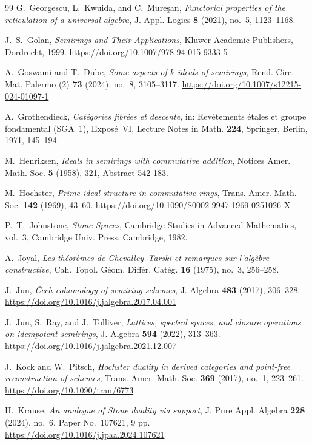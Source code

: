 \documentclass[12pt,leqno]{amsart}
\theoremstyle{definition}
\numberwithin{equation}{section}
\theoremstyle{remark}
\begin{document}
\begin{thebibliography}{99}
G.~Georgescu, L.~Kwuida, and C.~Mure\c{s}an,
\emph{Functorial properties of the reticulation of a universal algebra},
J. Appl. Logics \textbf{8} (2021), no.~5, 1123--1168.

J.~S.~Golan,
\emph{Semirings and Their Applications},
Kluwer Academic Publishers, Dordrecht, 1999.
\url{https://doi.org/10.1007/978-94-015-9333-5}

A.~Goswami and T.~Dube,
\emph{Some aspects of $k$-ideals of semirings},
Rend. Circ. Mat. Palermo (2) \textbf{73} (2024), no.~8, 3105--3117.
\url{https://doi.org/10.1007/s12215-024-01097-1}

A.~Grothendieck,
\emph{Cat\'egories fibr\'ees et descente},
in: Rev\^etements \'etales et groupe fondamental (SGA~1), Expos\'e~VI,
Lecture Notes in Math. \textbf{224}, Springer, Berlin, 1971, 145--194.

M.~Henriksen,
\emph{Ideals in semirings with commutative addition},
Notices Amer. Math. Soc. \textbf{5} (1958), 321, Abstract 542-183.

M.~Hochster,
\emph{Prime ideal structure in commutative rings},
Trans. Amer. Math. Soc. \textbf{142} (1969), 43--60.
\url{https://doi.org/10.1090/S0002-9947-1969-0251026-X}

P.~T.~Johnstone,
\emph{Stone Spaces},
Cambridge Studies in Advanced Mathematics, vol.~3,
Cambridge Univ. Press, Cambridge, 1982.

A.~Joyal,
\emph{Les th\'eor\`emes de Chevalley--Tarski et remarques sur l'alg\`ebre constructive},
Cah. Topol. G\'eom. Diff\'er. Cat\'eg. \textbf{16} (1975), no.~3, 256--258.

J.~Jun,
\emph{\v{C}ech cohomology of semiring schemes},
J. Algebra \textbf{483} (2017), 306--328.
\url{https://doi.org/10.1016/j.jalgebra.2017.04.001}

J.~Jun, S.~Ray, and J.~Tolliver,
\emph{Lattices, spectral spaces, and closure operations on idempotent semirings},
J. Algebra \textbf{594} (2022), 313--363.
\url{https://doi.org/10.1016/j.jalgebra.2021.12.007}

J.~Kock and W.~Pitsch,
\emph{Hochster duality in derived categories and point-free reconstruction of schemes},
Trans. Amer. Math. Soc. \textbf{369} (2017), no.~1, 223--261.
\url{https://doi.org/10.1090/tran/6773}

H.~Krause,
\emph{An analogue of Stone duality via support},
J. Pure Appl. Algebra \textbf{228} (2024), no.~6, Paper No.~107621, 9 pp.
\url{https://doi.org/10.1016/j.jpaa.2024.107621}


\end{thebibliography}
\end{document}
